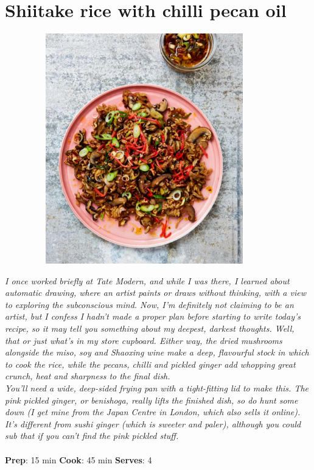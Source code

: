 \documentclass{book}
\begin{document}
\section{Shiitake rice with chilli pecan oil}
\begin{figure}
\centering\includegraphics[width=10cm,height=10cm,keepaspectratio]{Recipe_Pictures/Shiitake_rice_with_chilli_pecan_oil.png}
\end{figure}
\emph{I once worked briefly at Tate Modern, and while I was there, I learned about automatic drawing, where an artist paints or draws without thinking, with a view to exploring the subconscious mind. Now, I’m definitely not claiming to be an artist, but I confess I hadn’t made a proper plan before starting to write today’s recipe, so it may tell you something about my deepest, darkest thoughts. Well, that or just what’s in my store cupboard. Either way, the dried mushrooms alongside the miso, soy and Shaoxing wine make a deep, flavourful stock in which to cook the rice, while the pecans, chilli and pickled ginger add whopping great crunch, heat and sharpness to the final dish.\\ 
You’ll need a wide, deep-sided frying pan with a tight-fitting lid to make this. The pink pickled ginger, or benishoga, really lifts the finished dish, so do hunt some down (I get mine from the Japan Centre in London, which also sells it online). It’s different from sushi ginger (which is sweeter and paler), although you could sub that if you can’t find the pink pickled stuff.}\\\\ 
\textbf{Prep}: 15 min
\textbf{Cook}: 45 min
\textbf{Serves}: 4
\end{document}
